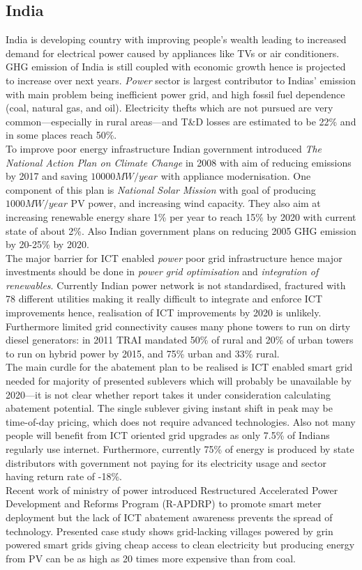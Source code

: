 \documentclass[11pt, twocolumn]{article}
\begin{document}
\subsection{India}
India is developing country with improving people's wealth leading to increased demand for electrical power caused by appliances like TVs or air conditioners. GHG emission of India is still coupled with economic growth hence is projected to increase over next years. \emph{Power} sector is largest contributor to Indias' emission with main problem being inefficient power grid, and high fossil fuel dependence (coal, natural gas, and oil). Electricity thefts which are not pursued are very common---especially in rural areas---and T\&D losses are estimated to be 22\% and in some places reach 50\%.\\
To improve poor energy infrastructure Indian government introduced \emph{The National Action Plan on Climate Change} in 2008 with aim of reducing emissions by 2017 and saving $10000 MW/year$ with appliance modernisation. One component of this plan is \emph{National Solar Mission} with goal of producing $1000 MW/year$ PV power, and increasing wind capacity. They also aim at increasing renewable energy share 1\% per year to reach 15\% by 2020 with current state of about 2\%. Also Indian government plans on reducing 2005 GHG emission by 20-25\% by 2020.\\
The major barrier for ICT enabled \emph{power} poor grid infrastructure hence major investments should be done in \emph{power grid optimisation} and \emph{integration of renewables}. Currently Indian power network is not standardised, fractured with 78 different utilities making it really difficult to integrate and enforce ICT improvements hence, realisation of ICT improvements by 2020 is unlikely.\\
Furthermore limited grid connectivity causes many phone towers to run on dirty diesel generators: in 2011 TRAI mandated 50\% of rural and 20\% of urban towers to run on hybrid power by 2015, and 75\% urban and 33\% rural.\\
The main curdle for the abatement plan to be realised is ICT enabled smart grid needed for majority of presented sublevers which will probably be unavailable by 2020---it is not clear whether report takes it under consideration calculating abatement potential. The single sublever giving instant shift in peak may be time-of-day pricing, which does not require advanced technologies. Also not many people will benefit from ICT oriented grid upgrades as only 7.5\% of Indians regularly use internet. Furthermore, currently 75\% of energy is produced by state distributors with government not paying for its electricity usage and sector having return rate of -18\%.\\
Recent work of ministry of power introduced Restructured Accelerated Power Development and Reforms Program (R-APDRP) to promote smart meter deployment but the lack of ICT abatement awareness prevents the spread of technology. Presented case study shows grid-lacking villages powered by grin powered smart grids giving cheap access to clean electricity but producing energy from PV can be as high as 20 times more expensive than from coal.
\end{document}
